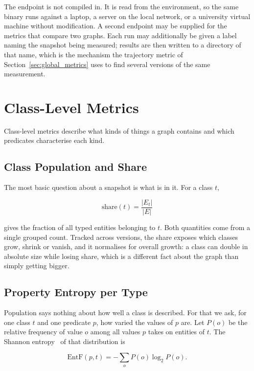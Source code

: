 The endpoint is not compiled in. It is read from the environment, so the same
binary runs against a laptop, a server on the local network, or a university
virtual machine without modification. A second endpoint may be supplied for the
metrics that compare two graphs. Each run may additionally be given a label
naming the snapshot being measured; results are then written to a directory of
that name, which is the mechanism the trajectory metric of
Section~\ref{sec:global_metrics} uses to find several versions of the same
measurement.

\section{Class-Level Metrics}
\label{sec:class_level_metrics}

Class-level metrics describe what kinds of things a graph contains and which
predicates characterise each kind.

\subsection{Class Population and Share}

The most basic question about a snapshot is what is in it. For a class $t$,

\begin{equation}
  \mathrm{share}(t) = \frac{|E_t|}{|E|}
  \label{eq:share}
\end{equation}

gives the fraction of all typed entities belonging to $t$. Both quantities come
from a single grouped count. Tracked across versions, the share exposes which
classes grow, shrink or vanish, and it normalises for overall growth: a class
can double in absolute size while losing share, which is a different fact about
the graph than simply getting bigger.

\subsection{Property Entropy per Type}

Population says nothing about how well a class is described. For that we ask, for
one class $t$ and one predicate $p$, how varied the values of $p$ are. Let $P(o)$
be the relative frequency of value $o$ among all values $p$ takes on entities of
$t$. The Shannon entropy~\cite{shannon1948mathematical} of that distribution is

\begin{equation}
  \mathrm{EntF}(p, t) = - \sum_{o} P(o) \log_2 P(o).
  \label{eq:entf}
\end{equation}

